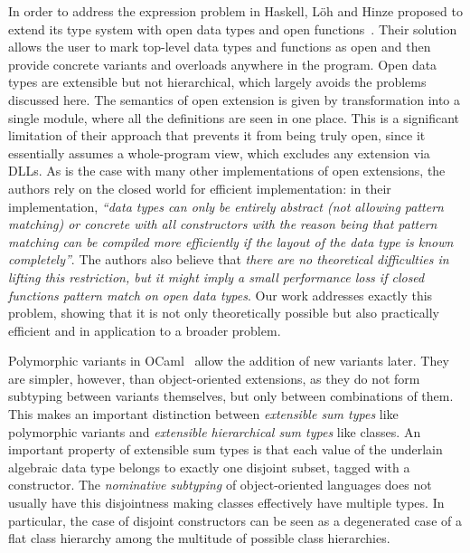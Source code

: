 \documentclass[preprint]{sigplanconf}
\begin{document}
In order to address the expression problem in Haskell, L\"{o}h and Hinze proposed to 
extend its type system with open data types and open functions~\cite{LohHinze2006}.
Their solution allows the user to mark top-level data types and functions as 
open and then provide concrete variants and overloads anywhere in the program. 
Open data types are extensible but not hierarchical, which largely avoids the 
problems discussed here. The semantics of open extension is given by 
transformation into a single module, where all the definitions are seen in one 
place. This is a significant limitation of their approach that prevents it from 
being truly open, since it essentially assumes a whole-program view, which 
excludes any extension via DLLs. As is the case with many other implementations 
of open extensions, the authors rely on the closed world for efficient 
implementation: in their implementation, \emph{``data types can only be entirely 
abstract (not allowing pattern matching) or concrete with all constructors with 
the reason being that pattern matching can be compiled more efficiently if the 
layout of the data type is known completely''}. The authors also believe that 
\emph{there are no theoretical difficulties in lifting this restriction, but it 
might imply a small performance loss if closed functions pattern match on open 
data types}. Our work addresses exactly this problem, showing that it is not 
only theoretically possible but also practically efficient and in application to 
a broader problem.

Polymorphic variants in OCaml~\cite{garrigue-98} allow the addition of new variants 
later. They are simpler, however, than object-oriented extensions, as they do not 
form subtyping between variants themselves, but only between combinations of them. 
This makes an important distinction between \emph{extensible sum types} like 
polymorphic variants and \emph{extensible hierarchical sum types} like classes.
An important property of extensible sum types is that each value of the 
underlain algebraic data type belongs to exactly one disjoint subset, tagged with 
a constructor. The \emph{nominative subtyping} of object-oriented languages does 
not usually have this disjointness making classes effectively have multiple 
types. In particular, the case of disjoint constructors can be seen as a 
degenerated case of a flat class hierarchy among the multitude of possible class 
hierarchies.
\end{document}
